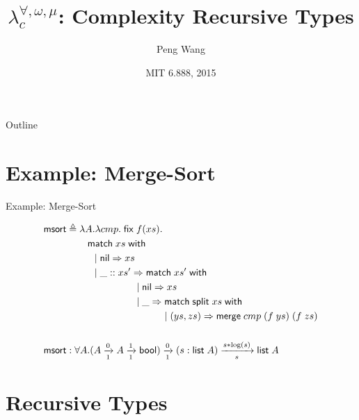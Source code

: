 \documentclass{beamer}
\title
{$\lambda^{\forall,\omega,\mu}_c$: Complexity Recursive Types}
\author
{Peng Wang}
\institute[MIT CSAIL] %
{
  MIT CSAIL
}
\date
{MIT 6.888, 2015}
\newcommand{\arrow}[4]{#1\xrightarrow[#3]{#2}#4}
\newcommand{\symmatch}{\mathsf{match}}
\newcommand{\symwith}{\mathsf{\;with\;}}
\newcommand{\symlist}{\mathsf{list}}
\newcommand{\symnil}{\mathsf{nil}}
\newcommand{\symfix}{\mathsf{fix}}
\newcommand{\symbool}{\mathsf{bool}}
\newcommand{\symmerge}{\mathsf{merge}}
\newcommand{\intro}[2]{(#1 : #2)}
\newcommand{\symmsort}{\mathsf{msort}}
\newcommand{\symsplit}{\mathsf{split}}
\newcommand{\defeq}{\triangleq}
\begin{document}
\begin{frame}
  \titlepage
\end{frame}

\begin{frame}{Outline}
  \tableofcontents
\end{frame}





\section{Example: Merge-Sort}

\begin{frame}{Example: Merge-Sort}

\begin{align*}
\symmsort &\defeq \lambda A. \lambda cmp.\;\symfix\;f(xs). \\
& \hspace{0.3in} \symmatch\;xs\symwith \\
& \hspace{.4in} |\; \symnil\Rightarrow xs \\
& \hspace{.4in} |\; \_::xs' \Rightarrow \symmatch\;xs'\symwith \\
& \hspace{1in} |\; \symnil\Rightarrow xs \\
& \hspace{1in} |\; \_ \Rightarrow \symmatch\; \symsplit\;xs \symwith \\
& \hspace{1.4in} |\; (ys, zs) \Rightarrow \symmerge\;cmp\;(f\;ys)\;(f\;zs) \\
\\
\symmsort &: \forall A.\arrow{(\arrow{A}{0}{1}{\arrow{A}{1}{1}{\symbool}})}{0}{1}{\arrow{\intro{s}{\symlist\;A}}{s*\log(s)}{s}{\symlist\;A}}
\end{align*}

\section{Recursive Types}

\end{frame}
\end{document}
